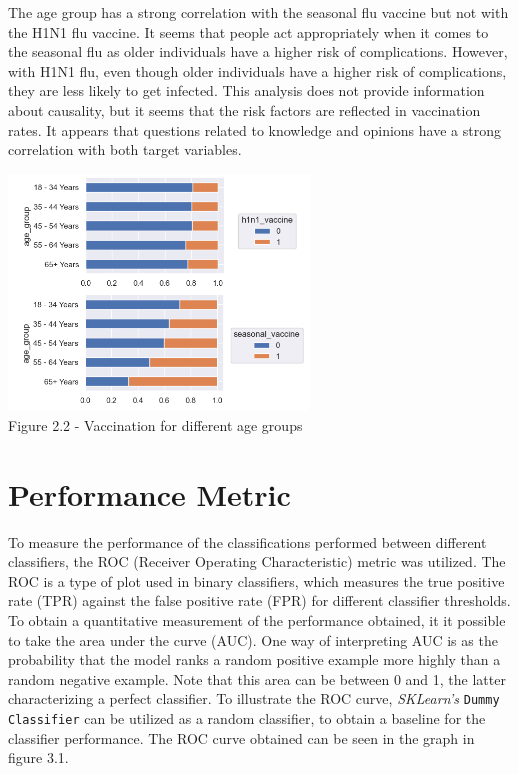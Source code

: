 \documentclass{IEEEtran}
\begin{document}
The age group has a strong correlation with the seasonal flu vaccine but not with the H1N1 flu vaccine. It seems that people act appropriately when it comes to the seasonal flu as older individuals have a higher risk of complications. However, with H1N1 flu, even though older individuals have a higher risk of complications, they are less likely to get infected. This analysis does not provide information about causality, but it seems that the risk factors are reflected in vaccination rates.
It appears that questions related to knowledge and opinions have a strong correlation with both target variables.

\begin{center}
    \includegraphics[width = 8cm]{figures/Age.png}\\
    Figure 2.2 - Vaccination for different age groups
\end{center}

\section{Performance Metric}
To measure the performance of the classifications performed between different classifiers, the ROC (Receiver Operating Characteristic) metric was utilized. The ROC is a type of plot used in binary classifiers, which measures the true positive rate (TPR) against the false positive rate (FPR) for different classifier thresholds. To obtain a quantitative measurement of the performance obtained, it it possible to take the area under the curve (AUC). One way of interpreting AUC is as the probability that the model ranks a random positive example more highly than a random negative example. Note that this area can be between 0 and 1, the latter characterizing a perfect classifier.
To illustrate the ROC curve, \textit{SKLearn's} \texttt{Dummy Classifier} \cite{b2} can be utilized as a random classifier, to obtain a baseline for the classifier performance. The ROC curve obtained can be seen in the graph in figure 3.1.
\end{document}
